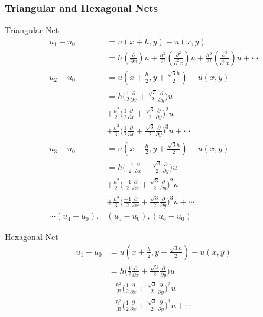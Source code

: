 \documentclass{beamer}
\begin{document}
\begin{frame}
\frametitle{Triangular and Hexagonal Nets}
\tiny
\begin{minipage}{.5\textwidth}
  \centering
  Triangular Net
\begin{align*}
u_1 - u_0 &= u(x+h,y) - u(x,y) \\
&= h (\frac{\partial}{\partial x})u + \frac{h^2}{2!}(\frac{\partial^2 }{\partial^2 x})u + \frac{h^3}{3!} (\frac{\partial^3}{\partial^3 x})u + \cdots\\
u_2 - u_0 &= u(x+\frac{h}{2},y+\frac{\sqrt{3}h}{2}) - u(x,y) \\
&= h \bigg(\frac{1}{2}\frac{\partial}{\partial x} + \frac{\sqrt{3}}{2} \frac{\partial}{\partial y} \bigg)u \\
&+ \frac{h^2}{2!}\bigg(\frac{1}{2}\frac{\partial}{\partial x} + \frac{\sqrt{3}}{2} \frac{\partial}{\partial y} \bigg)^2 u \\
&+ \frac{h^3}{3!} \bigg(\frac{1}{2}\frac{\partial}{\partial x} + \frac{\sqrt{3}}{2} \frac{\partial}{\partial y} \bigg)^3 u + \cdots\\
u_3 - u_0 &= u(x-\frac{h}{2},y+\frac{\sqrt{3}h}{2}) - u(x,y) \\
&= h \bigg(\frac{-1}{2}\frac{\partial}{\partial x} + \frac{\sqrt{3}}{2} \frac{\partial}{\partial y} \bigg)u \\
&+ \frac{h^2}{2!}\bigg(\frac{-1}{2}\frac{\partial}{\partial x} + \frac{\sqrt{3}}{2} \frac{\partial}{\partial y} \bigg)^2 u \\
&+ \frac{h^3}{3!} \bigg(\frac{-1}{2}\frac{\partial}{\partial x} + \frac{\sqrt{3}}{2} \frac{\partial}{\partial y} \bigg)^3 u + \cdots\\
\cdots (u_4-u_0), &(u_5-u_0), (u_6-u_0)
\end{align*}
\end{minipage}%
\begin{minipage}{.5\textwidth}
  \centering
  Hexagonal Net
\begin{align*}
u_1 - u_0 &= u(x+\frac{h}{2},y+\frac{\sqrt{3}h}{2}) - u(x,y) \\
&= h \bigg(\frac{1}{2}\frac{\partial}{\partial x} + \frac{\sqrt{3}}{2} \frac{\partial}{\partial y} \bigg)u \\
&+ \frac{h^2}{2!}\bigg(\frac{1}{2}\frac{\partial}{\partial x} + \frac{\sqrt{3}}{2} \frac{\partial}{\partial y} \bigg)^2 u \\
&+ \frac{h^3}{3!} \bigg(\frac{1}{2}\frac{\partial}{\partial x} + \frac{\sqrt{3}}{2} \frac{\partial}{\partial y} \bigg)^3 u + \cdots\\

\end{align*}
\end{minipage}
\end{frame}
\end{document}
